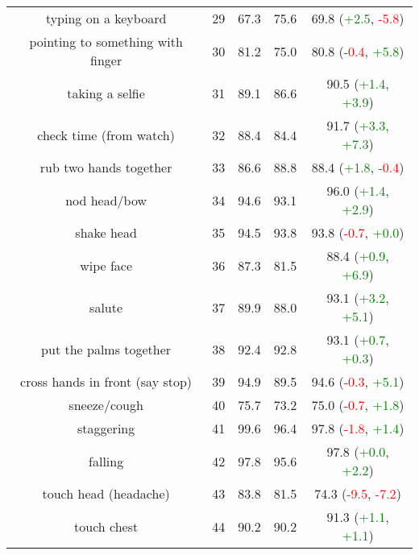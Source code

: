 \documentclass[runningheads]{llncs}
\begin{document}
\begin{centering}
\begin{longtable}{c|c|ccc}
        typing on a keyboard              & 29   & 67.3  & 75.6  & 69.8 (\textcolor{green}{+2.5}, \textcolor{red}{-5.8})     \\
        pointing to something with finger & 30   & 81.2  & 75.0     & 80.8 (\textcolor{red}{-0.4}, \textcolor{green}{+5.8})   \\
        taking a selfie                   & 31   & 89.1  & 86.6  & 90.5 (\textcolor{green}{+1.4}, \textcolor{green}{+3.9})  \\
        check time (from watch)           & 32   & 88.4  & 84.4   & 91.7 (\textcolor{green}{+3.3}, \textcolor{green}{+7.3})   \\
        rub two hands together            & 33   & 86.6  & 88.8  & 88.4 (\textcolor{green}{+1.8}, \textcolor{red}{-0.4})    \\
        nod head/bow                      & 34   & 94.6  & 93.1   & 96.0 (\textcolor{green}{+1.4}, \textcolor{green}{+2.9})   \\
        shake head                        & 35   & 94.5  & 93.8  & 93.8 (\textcolor{red}{-0.7}, \textcolor{green}{+0.0})  \\
        wipe face                         & 36   & 87.3  & 81.5   & 88.4  (\textcolor{green}{+0.9}, \textcolor{green}{+6.9})  \\
        salute                            & 37   & 89.9 & 88.0   & 93.1 (\textcolor{green}{+3.2}, \textcolor{green}{+5.1})  \\
        put the palms together            & 38   & 92.4  & 92.8   & 93.1 (\textcolor{green}{+0.7}, \textcolor{green}{+0.3})   \\
        cross hands in front (say stop)   & 39   & 94.9  & 89.5   & 94.6 (\textcolor{red}{-0.3}, \textcolor{green}{+5.1})  \\
        sneeze/cough                      & 40   & 75.7  & 73.2  & 75.0 (\textcolor{red}{-0.7}, \textcolor{green}{+1.8})  \\
        staggering                        & 41   & 99.6  & 96.4   & 97.8 (\textcolor{red}{-1.8}, \textcolor{green}{+1.4})  \\
        falling                           & 42   & 97.8  & 95.6   & 97.8 (\textcolor{green}{+0.0}, \textcolor{green}{+2.2})  \\
        touch head (headache)             & 43   & 83.8  & 81.5  & 74.3 (\textcolor{red}{-9.5}, \textcolor{red}{-7.2})    \\
        touch chest                       & 44   & 90.2  & 90.2     & 91.3 (\textcolor{green}{+1.1}, \textcolor{green}{+1.1})   \\

\end{longtable}
\end{centering}
\end{document}
